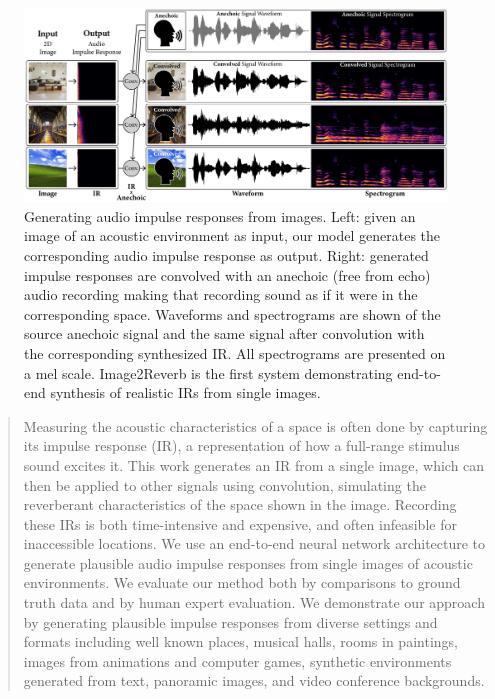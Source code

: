 \documentclass[10pt,twocolumn,letterpaper]{article}
\begin{document}
\begin{figure}[!ht]
    \centering
    \includegraphics[width=\textwidth]{splash.png}
    \caption{Generating audio impulse responses from images. Left: given an image of an acoustic environment as input, our model generates the corresponding audio impulse response as output. Right: generated impulse responses are convolved with an anechoic (free from echo) audio recording making that recording sound as if it were in the corresponding space. Waveforms and spectrograms are shown of the source anechoic signal and the same signal after convolution with the corresponding synthesized IR. All spectrograms are presented on a mel scale. Image2Reverb is the first system demonstrating end-to-end synthesis of realistic IRs from single images.}
    \label{fig:room2reverb_banner}
\end{figure}

\begin{abstract}
Measuring the acoustic characteristics of a space is often done by capturing its impulse response (IR), a representation of how a full-range stimulus sound excites it. This work generates an IR from a single image, which can then be applied to other signals using convolution, simulating the reverberant characteristics of the space shown in the image. Recording these IRs is both time-intensive and expensive, and often infeasible for inaccessible locations. We use an end-to-end neural network architecture to generate plausible audio impulse responses from single images of acoustic environments. We evaluate our method both by comparisons to ground truth data and by human expert evaluation. We demonstrate our approach by generating plausible impulse responses from diverse settings and formats including well known places, musical halls, rooms in paintings, images from animations and computer games, synthetic environments generated from text, panoramic images, and video conference backgrounds.
\end{abstract}
\end{document}
